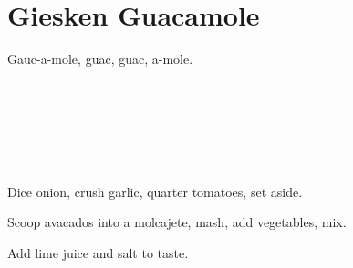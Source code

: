 \section[Guacamole]{Giesken Guacamole}

\begin{recipestats}[
        servings=8,
        preptime=10~\minute,
        source=The Giesken Family,
    ]
\end{recipestats}

\begin{recipeabstract}
    Gauc-a-mole, guac, guac, a-mole.
\end{recipeabstract}

\begin{ingredientcolumns}[1]
    \begin{ingredientblock}
        \\
        \\
        \\
        \\
        \\
    \end{ingredientblock}
\end{ingredientcolumns}

\begin{preparation}
\item Dice onion, crush garlic, quarter tomatoes, set aside.
\item Scoop avacados into a molcajete, mash, add vegetables, mix.
\item Add lime juice and salt to taste.
\end{preparation}

\recipeend%
